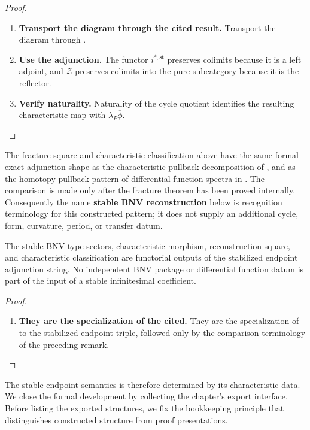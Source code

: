 \begin{proof}
\leavevmode
\begin{enumerate}[label=\textup{(\arabic*)}]
    \item \textbf{Transport the diagram through the cited result.}
    Transport the diagram through .

    \item \textbf{Use the adjunction.}
    The functor \(i^{*,\mathrm{st}}\) preserves colimits because it is a left adjoint, and \(\mathcal Z\)
    preserves colimits into the pure subcategory because it is the reflector.

    \item \textbf{Verify naturality.}
    Naturality of the cycle quotient identifies the resulting characteristic map with
    \(\lambda_P\overline\phi\).
\end{enumerate}
\end{proof}

\begin{remark}
\label{rem:stable-bnv-differential-function-spectra}
The fracture square and characteristic classification above have the same
formal exact-adjunction shape as the characteristic pullback decomposition of
\cite[Proposition~3.5]{BunkeNikolausVoelkl}, and as the homotopy-pullback pattern of differential
function spectra in \cite{HopkinsSinger2005}. The comparison is made only
after the fracture theorem has been proved internally. Consequently the name
\textbf{stable BNV reconstruction} below is recognition terminology for this
constructed pattern; it does not supply an additional cycle, form, curvature,
period, or transfer datum.
\end{remark}

\begin{corollary}
\label{cor:stable-bnv-intrinsic}
The stable BNV-type sectors, characteristic morphism, reconstruction square,
and characteristic classification are functorial outputs of the stabilized
endpoint adjunction string. No independent BNV package or differential
function datum is part of the input of a stable infinitesimal coefficient.
\end{corollary}

\begin{proof}
\leavevmode
\begin{enumerate}[label=\textup{(\arabic*)}]
    \item \textbf{They are the specialization of the cited.}
    They are the specialization of  to the stabilized endpoint
    triple, followed only by the comparison terminology of the preceding remark.
\end{enumerate}
\end{proof}
The stable endpoint semantics is therefore determined by its characteristic
data. We close the formal development by collecting the chapter's export
interface. Before listing the exported structures, we fix the bookkeeping
principle that distinguishes constructed structure from proof presentations.

